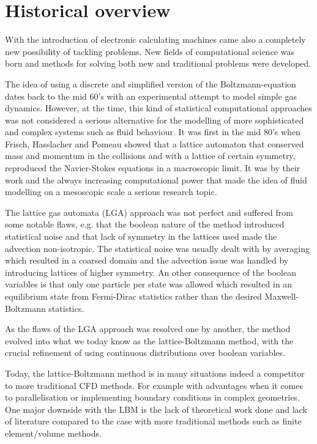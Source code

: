 \section{Historical overview}
With the introduction of electronic calculating machines came also a
completely new possibility of tackling problems. New fields of
computational science was born and methods for solving both new and
traditional problems were developed.

The idea of using a discrete and simplified version of the
Boltzmann-equation dates back to the mid 60's \cite{scholarpedia-lbm}
with an experimental attempt to model simple gas dynamics. However, at
the time, this kind of statistical computational approaches was not
considered a serious alternative for the modelling of more
sophisticated and complex systems such as fluid behaviour. It was
first in the mid 80's when Frisch, Hasslacher and Pomeau showed that a
lattice automaton that conserved mass and momentum in the collisions
and with a lattice of certain symmetry, reproduced the Navier-Stokes
equations in a macroscopic limit. It was by their work and the always
increasing computational power that made the idea of fluid modelling
on a mesoscopic scale a serious research topic. \cite{wolf-gladrow}

The lattice gas automata (LGA) approach was not perfect and suffered
from some notable flaws, e.g. that the boolean nature of the method
introduced statistical noise and that lack of symmetry in the lattices
used made the advection non-isotropic. The statistical noise was
usually dealt with by averaging which resulted in a coarsed domain and
the advection issue was handled by introducing lattices of higher
symmetry. An other consequence of the boolean variables is that only one
particle per state was allowed which resulted in an equilibrium state
from Fermi-Dirac statistics rather than the desired Maxwell-Boltzmann
statistics. 

As the flaws of the LGA approach was resolved one by
another, the method evolved into what we today know as the
lattice-Boltzmann method, with the crucial refinement of using
continuous distributions over boolean variables. \cite{wolf-gladrow}

Today, the lattice-Boltzmann method is in many situations indeed a
competitor to more traditional CFD methods. For example with
advantages when it comes to parallelisation or implementing boundary
conditions in complex geometries. One major downside with the LBM is
the lack of theoretical work done and lack of literature compared to
the case with more traditional methods such as finite element/volume
methods. \cite{junk-asym}

